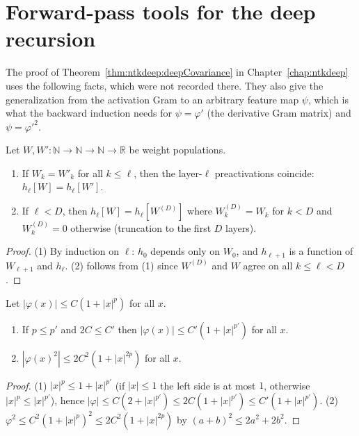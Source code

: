 \section{Forward-pass tools for the deep recursion}\label{sec:ntkcond:forward}

The proof of Theorem~\ref{thm:ntkdeep:deepCovariance} in Chapter~\ref{chap:ntkdeep} uses the following facts, which were not recorded there. They also give the generalization from the activation Gram to an arbitrary feature map $\psi$, which is what the backward induction needs for $\psi=\varphi'$ (the derivative Gram matrix) and $\psi=\varphi'^2$.

\begin{lemma}\label{lem:ntkcond:locality}
  \leanok
Let $W,W':\mathbb N\to\mathbb N\to\mathbb N\to\mathbb R$ be weight populations.
\begin{enumerate}
  \item If $W_k=W'_k$ for all $k\le\ell$, then the layer-$\ell$ preactivations coincide: $h_\ell[W]=h_\ell[W']$.
  \item If $\ell<D$, then $h_\ell[W]=h_\ell[W^{(D)}]$ where $W^{(D)}_k=W_k$ for $k<D$ and $W^{(D)}_k=0$ otherwise (truncation to the first $D$ layers).
\end{enumerate}
\end{lemma}

\begin{proof}
  \leanok
(1) By induction on $\ell$: $h_0$ depends only on $W_0$, and $h_{\ell+1}$ is a function of $W_{\ell+1}$ and $h_\ell$. (2) follows from (1) since $W^{(D)}$ and $W$ agree on all $k\le\ell<D$.
\end{proof}

\begin{lemma}\label{lem:ntkcond:polyGrowth}
  \leanok
Let $|\varphi(x)|\le C(1+|x|^p)$ for all $x$.
\begin{enumerate}
  \item If $p\le p'$ and $2C\le C'$ then $|\varphi(x)|\le C'(1+|x|^{p'})$ for all $x$.
  \item $|\varphi(x)^2|\le2C^2(1+|x|^{2p})$ for all $x$.
\end{enumerate}
\end{lemma}

\begin{proof}
  \leanok
(1) $|x|^p\le1+|x|^{p'}$ (if $|x|\le1$ the left side is at most $1$, otherwise $|x|^p\le|x|^{p'}$), hence $|\varphi|\le C(2+|x|^{p'})\le2C(1+|x|^{p'})\le C'(1+|x|^{p'})$. (2) $\varphi^2\le C^2(1+|x|^p)^2\le2C^2(1+|x|^{2p})$ by $(a+b)^2\le2a^2+2b^2$.
\end{proof}

